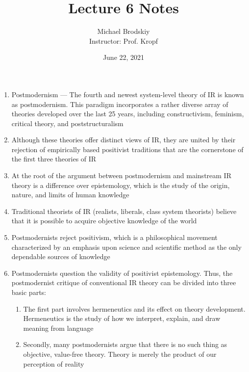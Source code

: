 \documentclass[12pt]{article}
\title{Lecture 6 Notes}
\date{June 22, 2021}
\author{Michael Brodskiy\\ \small Instructor: Prof. Kropf}
\begin{document}
    \maketitle

    \begin{enumerate}

      \item Postmodernism — The fourth and newest system-level theory of IR is known as postmodernism. This paradigm incorporates a rather diverse array of theories developed over the last 25 years, including constructivism, feminism, critical theory, and poststructuralism

      \item Although these theories offer distinct views of IR, they are united by their rejection of empirically based positivist traditions that are the cornerstone of the first three theories of IR

      \item At the root of the argument between postmodernism and mainstream IR theory is a difference over epistemology, which is the study of the origin, nature, and limits of human knowledge

      \item Traditional theorists of IR (realists, liberals, class system theorists) believe that it is possible to acquire objective knowledge of the world

      \item Postmodernists reject positivism, which is a philosophical movement characterized by an emphasis upon science and scientific method as the only dependable sources of knowledge

      \item Postmodernists question the validity of positivist epistemology. Thus, the postmodernist critique of conventional IR theory can be divided into three basic parts:

        \begin{enumerate}

          \item The first part involves hermeneutics and its effect on theory development. Hermeneutics is the study of how we interpret, explain, and draw meaning from language

          \item Secondly, many postmodernists argue that there is no such thing as objective, value-free theory. Theory is merely the product of our perception of reality


\end{enumerate}
\end{enumerate}
\end{document}
